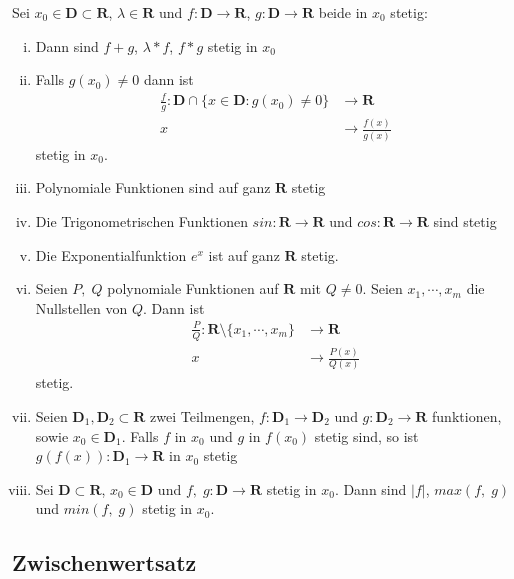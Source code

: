 \documentclass[8pt]{article}
\begin{document}
\begin{multicols*}{3}
Sei $x_0 \in \mathbf{D} \subset \mathbf{R}$, $\lambda \in \mathbf{R}$ und $f: \mathbf{D} \rightarrow \mathbf{R}$,
$g: \mathbf{D} \rightarrow \mathbf{R}$ beide in $x_0$ stetig:
\begin{enumerate}[(i)]
  \item Dann sind $f + g$, $\lambda * f$, $f * g$ stetig in $x_0$
  \item Falls $g(x_0) \neq 0$ dann ist
  \begin{align*}
    \frac{f}{g}: \mathbf{D} \cap \{x \in \mathbf{D}: g(x_0) \neq 0\} &\rightarrow \mathbf{R}\\
    x &\rightarrow \frac{f(x)}{g(x)}
  \end{align*}
  stetig in $x_0$.
  \item Polynomiale Funktionen sind auf ganz $\mathbf{R}$ stetig
  \item Die Trigonometrischen Funktionen $sin: \mathbf{R} \rightarrow \mathbf{R}$ und $cos: \mathbf{R} \rightarrow \mathbf{R}$ sind stetig
  \item Die Exponentialfunktion $e^x$ ist auf ganz $\mathbf{R}$ stetig.
  \item Seien $P, \;Q$ polynomiale Funktionen auf $\mathbf{R}$ mit $Q \neq 0$.
  Seien $x_1, \cdots, x_m$ die Nullstellen von $Q$. Dann ist
  \begin{align*}
    \frac{P}{Q} : \mathbf{R} \setminus \{x_1, \cdots, x_m\} &\rightarrow \mathbf{R}\\
    x &\rightarrow \frac{P(x)}{Q(x)}
  \end{align*}
  stetig.
  \item Seien $\mathbf{D}_1, \mathbf{D}_2 \subset \mathbf{R}$ zwei Teilmengen,
  $f:\mathbf{D}_1 \rightarrow \mathbf{D}_2$ und $g:\mathbf{D}_2 \rightarrow \mathbf{R}$
  funktionen, sowie $x_0 \in \mathbf{D}_1$. Falls $f$ in $x_0$ und $g$ in $f(x_0)$ stetig
  sind, so ist $g(f(x)): \mathbf{D}_1 \rightarrow \mathbf{R}$ in $x_0$ stetig
  \item Sei $\mathbf{D} \subset \mathbf{R}$, $x_0 \in \mathbf{D}$ und $f,\;g: \mathbf{D} \rightarrow \mathbf{R}$
  stetig in $x_0$. Dann sind $|f|$, $max(f,\;g)$ und $min(f, \; g)$ stetig in $x_0$.
\end{enumerate}

\subsection{Zwischenwertsatz}


\end{multicols*}
\end{document}
